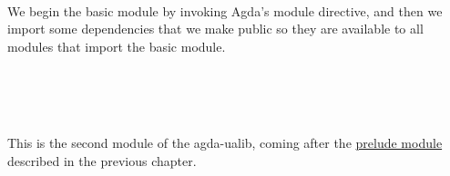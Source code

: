 \documentclass[sigplan,screen]{acmart}
\newcommand\preludemodule{\href{https://gitlab.com/ualib/ualib.gitlab.io/-/blob/master/prelude.lagda.rst}{prelude module}\xspace}
\begin{document}
\begin{code}%
\>[0]\AgdaSymbol{\{-\#}\AgdaSpace{}%
\AgdaSpace{}%
\AgdaSpace{}%
\AgdaSpace{}%
\AgdaSpace{}%
\AgdaSymbol{\#-\}}\<%
\\
\>[0]\<%
\end{code}
We begin the basic module by invoking Agda's module directive, and then we import some dependencies that we make public so they are available to all modules that import the basic module.
\begin{code}%
\>[0]\AgdaSpace{}%
\AgdaSpace{}%
\<%
\\
\\[\AgdaEmptyExtraSkip]%
\>[0]\AgdaSpace{}%
\AgdaSpace{}%
\AgdaSpace{}%
\AgdaSpace{}%
\AgdaSymbol{(}\AgdaSymbol{;}\AgdaSpace{}%
\AgdaSymbol{;}\AgdaSpace{}%
\AgdaSymbol{;}\AgdaSpace{}%
\AgdaSymbol{;}\AgdaSpace{}%
\AgdaSymbol{;}\AgdaSpace{}%
\AgdaSymbol{;}\<%
\\
\>[0][@{}l@{\AgdaIndent{0}}]%
\>[2]\AgdaSymbol{;}\AgdaSpace{}%
\AgdaSymbol{;}\AgdaSymbol{;}\AgdaSpace{}%
\AgdaOperator{\AgdaInductiveConstructor{\AgdaUnderscore{},\AgdaUnderscore{}}}\AgdaSymbol{;}\AgdaSpace{}%
\AgdaSymbol{;}\AgdaSpace{}%
\AgdaSymbol{;}\AgdaSpace{}%
\AgdaSymbol{;}\AgdaSpace{}%
\AgdaSymbol{;}\AgdaSpace{}%
\AgdaSymbol{;}\AgdaSpace{}%
\AgdaSymbol{;}\AgdaSpace{}%
\AgdaSymbol{;}\AgdaSpace{}%
\AgdaSymbol{;}\AgdaSpace{}%
\AgdaSymbol{;}\AgdaSpace{}%
\AgdaSymbol{)}\AgdaSpace{}\<%
\end{code}
This is the second module of the agda-ualib, coming after the \preludemodule described in the previous chapter.
\end{document}
